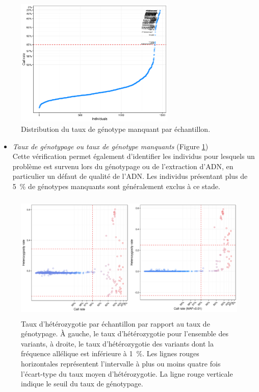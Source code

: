 \documentclass[11pt,a4paper,notrimn]{krantz}
\providecommand{\tightlist}{%
  \setlength{\itemsep}{0pt}\setlength{\parskip}{0pt}}
\theoremstyle{definition}
\theoremstyle{definition}
\theoremstyle{remark}
\begin{document}
\begin{figure}[!htb]

{\centering \includegraphics[width=3in,height=2.4in]{FiguresTables/samplecallrateevaluation} 

}

\caption{Distribution du taux de génotype manquant
par échantillon.}\label{fig:samplecallrateevaluation}
\end{figure}

\begin{itemize}
\tightlist
\item
  \emph{Taux de génotypage ou taux de génotype manquants} (Figure
  \ref{fig:samplecallrateevaluation})\\
  Cette vérification permet également d'identifier les individus pour
  lesquels un problème est survenu lors du génotypage ou de l'extraction
  d'ADN, en particulier un défaut de qualité de l'ADN. Les individus
  présentant plus de 5~\% de génotypes manquants sont généralement
  exclus à ce stade.
\end{itemize}









\begin{figure}[!htb]

{\centering \includegraphics[width=6in,height=2.4in]{FiguresTables/heterozygositycheck} 

}

\caption{Taux d'hétérozygotie par échantillon par
rapport au taux de génotypage. À gauche, le taux d'hétérozygotie pour
l'ensemble des variants, à droite, le taux d'hétérozygotie des variants
dont la fréquence allélique est inférieure à 1~\%. Les lignes rouges
horizontales représentent l'intervalle à plus ou moins quatre fois
l'écart-type du taux moyen d'hétérozygotie. La ligne rouge verticale
indique le seuil du taux de génotypage.}\label{fig:heterozygositycheck}
\end{figure}
\end{document}
